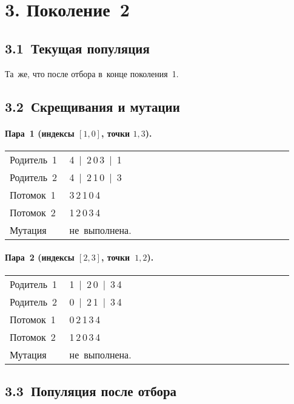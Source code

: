 \documentclass[a4paper,12pt]{article}
\begin{document}
\section*{3. Поколение 2}

\subsection*{3.1 Текущая популяция}

Та же, что после отбора в конце поколения 1.

\subsection*{3.2 Скрещивания и мутации}

\paragraph{Пара 1 (индексы $[1,0]$, точки $1,3$).}
\begin{longtable}{@{}p{0.18\linewidth}p{0.75\linewidth}@{}}
Родитель 1 & 4 \,|\, 2\,0\,3 \,|\, 1\\
Родитель 2 & 4 \,|\, 2\,1\,0 \,|\, 3\\
Потомок 1  & 3\,2\,1\,0\,4\\
Потомок 2  & 1\,2\,0\,3\,4\\
Мутация    & не выполнена.\\
\end{longtable}

\paragraph{Пара 2 (индексы $[2,3]$, точки $1,2$).}
\begin{longtable}{@{}p{0.18\linewidth}p{0.75\linewidth}@{}}
Родитель 1 & 1 \,|\, 2\,0 \,|\, 3\,4\\
Родитель 2 & 0 \,|\, 2\,1 \,|\, 3\,4\\
Потомок 1  & 0\,2\,1\,3\,4\\
Потомок 2  & 1\,2\,0\,3\,4\\
Мутация    & не выполнена.\\
\end{longtable}

\subsection*{3.3 Популяция после отбора}
\end{document}
